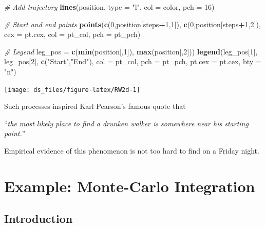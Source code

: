 \documentclass[12pt,]{krantz}
\newenvironment{Shaded}{\begin{snugshade}}{\end{snugshade}}
\newcommand{\KeywordTok}[1]{\textcolor[rgb]{0.27,0.27,0.27}{\textbf{#1}}}
\newcommand{\DataTypeTok}[1]{\textcolor[rgb]{0.27,0.27,0.27}{#1}}
\newcommand{\DecValTok}[1]{\textcolor[rgb]{0.06,0.06,0.06}{#1}}
\newcommand{\StringTok}[1]{\textcolor[rgb]{0.5,0.5,0.5}{#1}}
\newcommand{\CommentTok}[1]{\textcolor[rgb]{0.37,0.37,0.37}{\textit{#1}}}
\newcommand{\OperatorTok}[1]{\textcolor[rgb]{0.43,0.43,0.43}{\textbf{#1}}}
\newcommand{\NormalTok}[1]{#1}
\renewenvironment{quote}{\begin{VF}}{\end{VF}}
\begin{document}
\begin{Shaded}
\begin{Highlighting}[]
\CommentTok{# Add trajectory}
\KeywordTok{lines}\NormalTok{(position, }\DataTypeTok{type =} \StringTok{"l"}\NormalTok{, }\DataTypeTok{col =}\NormalTok{ color, }\DataTypeTok{pch =} \DecValTok{16}\NormalTok{)}
  
\CommentTok{# Start and end points}
\KeywordTok{points}\NormalTok{(}\KeywordTok{c}\NormalTok{(}\DecValTok{0}\NormalTok{,position[steps}\OperatorTok{+}\DecValTok{1}\NormalTok{,}\DecValTok{1}\NormalTok{]), }\KeywordTok{c}\NormalTok{(}\DecValTok{0}\NormalTok{,position[steps}\OperatorTok{+}\DecValTok{1}\NormalTok{,}\DecValTok{2}\NormalTok{]), }\DataTypeTok{cex =}\NormalTok{ pt.cex, }\DataTypeTok{col =}\NormalTok{ pt_col, }\DataTypeTok{pch =}\NormalTok{ pt_pch)}
  
\CommentTok{# Legend}
\NormalTok{leg_pos =}\StringTok{ }\KeywordTok{c}\NormalTok{(}\KeywordTok{min}\NormalTok{(position[,}\DecValTok{1}\NormalTok{]), }\KeywordTok{max}\NormalTok{(position[,}\DecValTok{2}\NormalTok{]))}
\KeywordTok{legend}\NormalTok{(leg_pos[}\DecValTok{1}\NormalTok{], leg_pos[}\DecValTok{2}\NormalTok{], }\KeywordTok{c}\NormalTok{(}\StringTok{"Start"}\NormalTok{,}\StringTok{"End"}\NormalTok{), }
      \DataTypeTok{col =}\NormalTok{ pt_col, }\DataTypeTok{pch =}\NormalTok{ pt_pch, }\DataTypeTok{pt.cex =}\NormalTok{ pt.cex, }\DataTypeTok{bty =} \StringTok{"n"}\NormalTok{)}
\end{Highlighting}
\end{Shaded}

\begin{center}\texttt{[image: ds\_files/figure-latex/RW2d-1]} \end{center}

Such processes inspired Karl Pearson's famous quote that

\begin{quote}
``\emph{the most likely place to find a drunken walker is somewhere near
his starting point.}''
\end{quote}

Empirical evidence of this phenomenon is not too hard to find on a
Friday night.

\section{Example: Monte-Carlo
Integration}\label{example-monte-carlo-integration}

\subsection{Introduction}\label{introduction-2}
\end{document}
